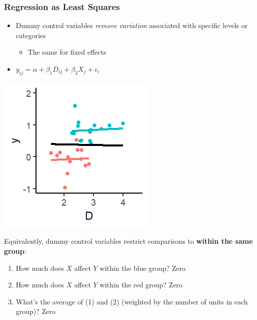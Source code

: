 \documentclass[xcolor=x11names,compress]{beamer}\usepackage[]{graphicx}\usepackage[]{color}
\makeatletter
\def\maxwidth{ %
  \ifdim\Gin@nat@width>\linewidth
    \linewidth
  \else
    \Gin@nat@width
  \fi
}
\newenvironment{knitrout}{}{} %
\renewcommand{\(}{\begin{columns}}
\renewcommand{\)}{\end{columns}}
\newcommand{\<}[1]{\begin{column}{#1}}
\renewcommand{\>}{\end{column}}
\makeatother
\begin{document}
\begin{frame}
\frametitle{Regression as Least Squares}
\begin{itemize}
\item Dummy control variables \textit{remove variation} associated with specific levels or categories
\begin{itemize}
\item The same for fixed effects
\end{itemize}
\item $y_{ij} = \alpha + \beta_1 D_{ij} + \beta_2 X_j + \epsilon_i$
\end{itemize}
\begin{multicols}{2}
\begin{knitrout}
\color{fgcolor}
\includegraphics[width=\maxwidth]{figure/graph_ols_FE_last-1} 

\end{knitrout}
\columnbreak
\footnotesize
Equivalently, dummy control variables restrict comparisons to \textbf{within the same group}:
\begin{enumerate}
\item How much does $X$ affect $Y$ within the blue group? Zero
\item How much does $X$ affect $Y$ within the red group? Zero
\item What's the average of (1) and (2) (weighted by the number of units in each group)? Zero
\normalsize
\end{enumerate}
\end{multicols}
\end{frame}
\end{document}
